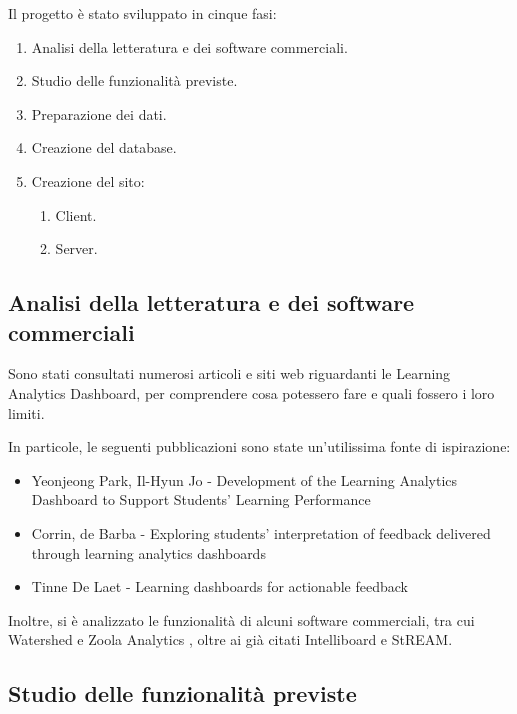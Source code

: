 Il progetto è stato sviluppato in cinque fasi:

\begin{enumerate}

\item Analisi della letteratura e dei software commerciali.
\item Studio delle funzionalità previste.
\item Preparazione dei dati.
\item Creazione del database.
\item Creazione del sito:
\begin{enumerate}[label=\arabic*.]
\item Client. 
\item Server. 
\end{enumerate} 

\end{enumerate}

\subsection{Analisi della letteratura e dei software commerciali}

Sono stati consultati numerosi articoli e siti web riguardanti le Learning Analytics Dashboard, per comprendere cosa potessero fare e quali fossero i loro limiti.

In particole, le seguenti pubblicazioni sono state un'utilissima fonte di ispirazione:

\begin{itemize}

\item Yeonjeong Park, Il-Hyun Jo - Development of the Learning Analytics Dashboard to Support Students’ Learning Performance
\item Corrin, de Barba - Exploring students' interpretation of feedback delivered through learning analytics dashboards
\item Tinne De Laet - Learning dashboards for actionable feedback

\end{itemize}

Inoltre, si è analizzato le funzionalità di alcuni software commerciali,
tra cui Watershed \cite{Watershed} e Zoola Analytics \cite{Zoola}, oltre ai già citati Intelliboard e StREAM.

\subsection{Studio delle funzionalità previste}

